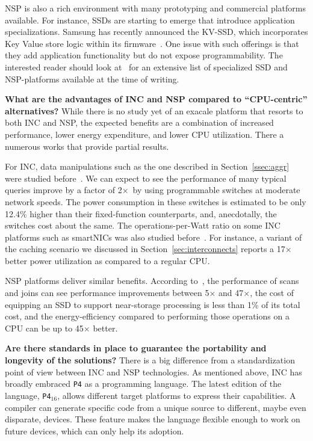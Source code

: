 \documentclass[11pt,dvipdfmx]{article}
\newcommand{\softsubsec}[1]{\vspace{0.6em}\noindent\textbf{#1}}
\begin{document}
NSP is also a rich environment with many prototyping and commercial platforms
available.
For instance, SSDs are starting to emerge that introduce application
specializations.
Samsung has recently announced the KV-SSD, which incorporates Key Value store
logic within its firmware~\cite{ki17}.
One issue with such offerings is that they add application functionality
but do not expose programmability.
The interested reader should look at~\cite{picoli20} for an extensive list of
specialized SSD and NSP-platforms available at the time of writing.


\softsubsec{What are the advantages of INC and NSP compared to ``CPU-centric''
alternatives?}
%
While there is no study yet of an exacale platform that resorts to both INC and
NSP, the expected benefits are a combination of increased performance, lower
energy expenditure, and lower CPU utilization.
There a numerous works that provide partial results.

For INC, data manipulations such as the one described in Section~\ref{ssec:aggr}
were studied before~\cite{lerner19}.
We can expect to see the performance of many typical queries improve by a factor of
2$\times$\ by using programmable switches at moderate network
speeds.
The power consumption in these switches is estimated to be only 12.4\% higher
than their fixed-function counterparts, and, anecdotally, the switches cost
about the same.
The operations-per-Watt ratio on some INC platforms such as smartNICs was
also studied before~\cite{tokusashi18}.
For instance, a variant of the caching scenario we discussed in
Section~\ref{sec:interconnects} reports a 17$\times$ better power utilization as
compared to a regular CPU.


NSP platforms deliver similar benefits.
According to~\cite{kim16}, the performance of scans and joins can see
performance improvements between 5$\times$ and 47$\times$, the cost of equipping
an SSD to support near-storage processing is less than 1\% of its total cost,
and the energy-efficiency compared to performing those operations on a CPU can be up
to 45$\times$ better.


\softsubsec{Are there standards in place to guarantee the portability and
longevity of the solutions?}
%
There is a big difference from a standardization point of view between INC and
NSP technologies.
As mentioned above, INC has broadly embraced \texttt{P4} as a programming language.
The latest edition of the language, \texttt{P4$_{16}$}, allows different target
platforms to express their capabilities.
A compiler can generate specific code from a unique source to different, maybe
even disparate, devices.
These feature makes the language flexible enough to work on future devices,
which can only help its adoption.
\end{document}
